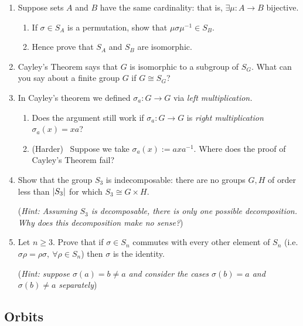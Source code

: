 \begin{exercises}
\begin{enumerate}
	
  \item\label{exs:symmwd} Suppose sets $A$ and $B$ have the same cardinality: that is, $\exists \mu:A\to B$ bijective.
  \begin{enumerate}
    \item If $\sigma\in S_A$ is a permutation, show that $\mu\sigma\mu^{-1}\in S_B$.
    \item Hence prove that $S_A$ and $S_B$ are isomorphic.
  \end{enumerate}
  
  
  \item Cayley's Theorem says that $G$ is isomorphic to a subgroup of $S_G$.  What can you say about a finite group $G$ if $G\cong S_G$?

  
  \item In Cayley's theorem we defined $\sigma_a:G\to G$ via \emph{left multiplication.}
  \begin{enumerate}
    \item Does the argument still work if $\sigma_a:G\to G$ is \emph{right multiplication} $\sigma_a(x)=xa$?
    
    \item (Harder) \ Suppose we take $\sigma_a(x):=axa^{-1}$. Where does the proof of Cayley's Theorem fail?
  \end{enumerate}
	
	
	\item Show that the group $S_3$ is indecomposable: there are no groups $G,H$ of order less than $\left| S_3\right|$ for which $S_3\cong G\times H$.\par
	(\emph{Hint: Assuming $S_3$ is decomposable, there is only one possible decomposition. Why does this decomposition make no sense?})
  
  
  \item Let $n\ge 3$. Prove that if $\sigma\in S_n$ commutes with every other element of $S_n$ (i.e. $\sigma\rho=\rho\sigma,\ \forall \rho\in S_n$) then $\sigma$ is the identity.\par
  (\emph{Hint: suppose $\sigma(a)=b\neq a$ and consider the cases $\sigma(b)=a$ and $\sigma(b)\neq a$ separately})

\end{enumerate}
\end{exercises}

\clearpage

\subsection{Orbits}\label{sec:orbits}

